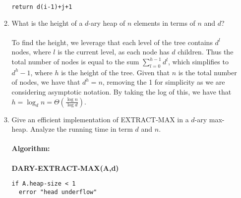 \documentclass{article}
\begin{document}
\begin{enumerate}
\begin{enumerate}
\begin{lstlisting}
return d(i-1)+j+1
\end{lstlisting}
		\item What is the height of a $d$-ary heap of $n$ elements in terms of $n$ and $d$?
\\\\ To find the height, we leverage that each level of the tree contains $d^l$ nodes, where $l$ is the current level, as each node has $d$ children. Thus the total number of nodes is equal to the sum $\sum_{l=0}^{h-1}d^l$, which simplifies to $d^h-1$, where $h$ is the height of the tree. Given that $n$ is the total number of nodes, we have that $d^h=n$, removing the 1 for simplicity as we are considering asymptotic notation. By taking the log of this, we have that $h=\log_dn= \Theta(\frac{\log n}{\log d})$.
		\item Give an efficient implementation of EXTRACT-MAX in a $d$-ary max-heap. Analyze the running time in term $d$ and $n$.
\\\\ \textbf{Algorithm:} 
\\\\ \textbf{DARY-EXTRACT-MAX(A,d)}
\begin{lstlisting}
if A.heap-size < 1
  error "head underflow"


\end{lstlisting}
\end{enumerate}
\end{enumerate}
\end{document}
